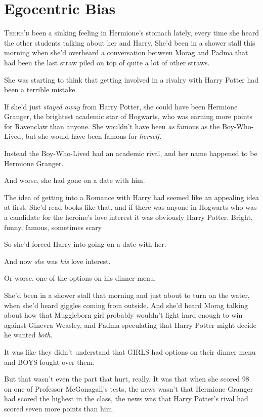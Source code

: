 \chapter{Egocentric Bias}

\lettrine{T}{here'd} been a sinking feeling in Hermione's stomach lately, every time she
heard the other students talking about her and Harry. She'd been in a shower
stall this morning when she'd overheard a conversation between Morag and Padma
that had been the last straw piled on top of quite a lot of other straws.

She was starting to think that getting involved in a rivalry with Harry Potter
had been a terrible mistake.

If she'd just \emph{stayed away} from Harry Potter, she could have been
Hermione Granger, the brightest academic star of Hogwarts, who was earning more
points for Ravenclaw than anyone. She wouldn't have been \emph{as} famous as
the Boy-Who-Lived, but she would have been famous for \emph{herself}.

Instead the Boy-Who-Lived had an academic rival, and her name happened to be
Hermione Granger.

And worse, she had gone on a date with him.

The idea of getting into a Romance with Harry had seemed like an appealing idea
at first. She'd read books like that, and if there was anyone in Hogwarts who
was a candidate for the heroine's love interest it was obviously Harry Potter.
Bright, funny, famous, sometimes scary{\el}

So she'd forced Harry into going on a date with her.

And now \emph{she} was \emph{his} love interest.

Or worse, one of the options on his dinner menu.

She'd been in a shower stall that morning and just about to turn on the water,
when she'd heard giggles coming from outside. And she'd heard Morag talking
about how that Muggleborn girl probably wouldn't fight hard enough to win
against Ginevra Weasley, and Padma speculating that Harry Potter might decide
he wanted \emph{both}.

It was like they didn't understand that GIRLS had options on their dinner menu
and BOYS fought over them.

But that wasn't even the part that hurt, really. It was that when she scored 98
on one of Professor McGonagall's tests, the news wasn't that Hermione Granger
had scored the highest in the class, the news was that Harry Potter's rival had
scored seven more points than him.

